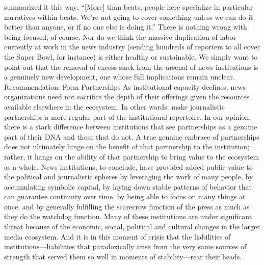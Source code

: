 summarized it this way: ``[More] than beats, people here specialize in particular
narratives within beats. We’re not going to cover something unless we can do it
better than anyone, or if no one else is doing it.''
There is nothing wrong with being focused, of course. Nor do we think the
massive duplication of labor currently at work in the news industry (sending
hundreds of reporters to all cover the Super Bowl, for instance) is either healthy
or sustainable. We simply want to point out that the removal of excess slack from
the arsenal of news institutions is a genuinely new development, one whose full
implications remain unclear.
Recommendation: Form Partnerships
As institutional capacity declines, news organizations need not sacrifice
the depth of their offerings given the resources available elsewhere in
the ecosystem. In other words: make journalistic partnerships a more
regular part of the institutional repertoire.
In our opinion, there is a stark difference between institutions that see
partnerships as a genuine part of their DNA and those that do not. A
true genuine embrace of partnerships does not ultimately hinge on
the benefit of that partnership to the institution; rather, it hangs on the
ability of that partnership to bring value to the ecosystem as a whole.
News institutions, to conclude, have provided added public value to the political
and journalistic spheres by leveraging the work of many people, by accumulating
symbolic capital, by laying down stable patterns of behavior that can guarantee
continuity over time, by being able to focus on many things at once, and by generally
fulfilling the scarecrow function of the press as much as they do the watchdog
function. Many of these institutions are under significant threat because of
the economic, social, political and cultural changes in the larger media ecosystem.
And it is in this moment of crisis that the liabilities of institutions—liabilities that
paradoxically arise from the very same sources of strength that served them so
well in moments of stability—rear their heads.

